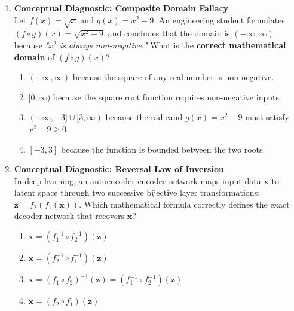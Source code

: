 \begin{enumerate}[resume]
\item \textbf{Conceptual Diagnostic: Composite Domain Fallacy} \\
Let $f(x) = \sqrt{x}$ and $g(x) = x^2 - 9$. An engineering student formulates $(f \circ g)(x) = \sqrt{x^2 - 9}$ and concludes that the domain is $(-\infty, \infty)$ because \textit{"$x^2$ is always non-negative."} What is the \textbf{correct mathematical domain} of $(f \circ g)(x)$?
\begin{enumerate}
    \item $(-\infty, \infty)$ because the square of any real number is non-negative.
    \item $[0, \infty)$ because the square root function requires non-negative inputs.
    \item $(-\infty, -3] \cup [3, \infty)$ because the radicand $g(x) = x^2 - 9$ must satisfy $x^2 - 9 \ge 0$.
    \item $[-3, 3]$ because the function is bounded between the two roots.
\end{enumerate}

\item \textbf{Conceptual Diagnostic: Reversal Law of Inversion} \\
In deep learning, an autoencoder encoder network maps input data $\mathbf{x}$ to latent space through two successive bijective layer transformations: $\mathbf{z} = f_2(f_1(\mathbf{x}))$. Which mathematical formula correctly defines the exact decoder network that recovers $\mathbf{x}$?
\begin{enumerate}
    \item $\mathbf{x} = (f_1^{-1} \circ f_2^{-1})(\mathbf{z})$
    \item $\mathbf{x} = (f_2^{-1} \circ f_1^{-1})(\mathbf{z})$
    \item $\mathbf{x} = (f_1 \circ f_2)^{-1}(\mathbf{z}) = (f_1^{-1} \circ f_2^{-1})(\mathbf{z})$
    \item $\mathbf{x} = (f_2 \circ f_1)(\mathbf{z})$
\end{enumerate}
\end{enumerate}